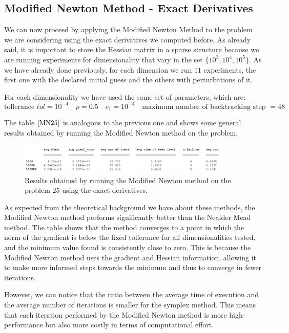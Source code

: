 \medskip
\subsection*{Modified Newton Method - Exact Derivatives}
We can now proceed by applying the Modified Newton Method to the problem we are considering using the exact derivatives we computed before. As already said, it is important to store the Hessian matrix in a sparse structure because we are running experiments for dimensionality that vary in the set $\{10^3, 10^4, 10^5\}$. 
As we have already done previously, for each dimension we run $11$ experiments, the first one with the declared initial guess and the others with perturbations of it.

For each dimensionality we have used the same set of parameters, which are:
\begin{equation*}
    \text{tollerance } tol = 10^{-4}  \quad
    \rho = 0.5 \quad 
    c_1 = 10^{-4} \quad
    \text{maximum number of backtracking step } = 48
\end{equation*}

The table $\eqref{MN25}$ is analogous to the previous one and shows some general results obtained by running the Modified Newton method on the problem.
\begin{figure}[htbp]
    \centering
    \includegraphics[width = 0.9\textwidth]{img/pb25_MN_table.png}
    \caption{Results obtained by running the Modified Newton method on the problem $25$ using the exact derivatives.}
    \label{MN25}
\end{figure}

As expected from the theoretical background we have about these methods, the Modified Newton method performs significantly better than the Nealder Mead method. The table shows that the method converges to a point in which the norm of the gradient is below the fixed tollerance for all dimensionalities tested, and the minimum value found is consistently close to zero. 
This is because the Modified Newton method uses the gradient and Hessian information, allowing it to make more informed steps towards the minimum and thus to converge in fewer iterations.

However, we can notice that the ratio between the average time of execution and the average number of iterations is smaller for the symplex method. This means that each iteration performed by the Modified Newton method is more high-performance but also more costly in terms of computational effort. 

